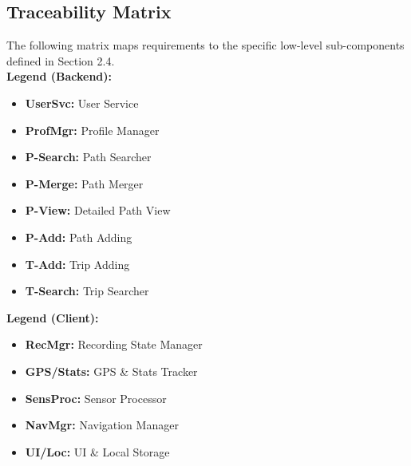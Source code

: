 \newpage

\subsection{Traceability Matrix}
The following matrix maps requirements to the specific low-level sub-components defined in Section 2.4.
\\
\textbf{Legend (Backend):}
\begin{itemize}
    \item \textbf{UserSvc:} User Service
    \item \textbf{ProfMgr:} Profile Manager
    \item \textbf{P-Search:} Path Searcher
    \item \textbf{P-Merge:} Path Merger
    \item \textbf{P-View:} Detailed Path View
    \item \textbf{P-Add:} Path Adding
    \item \textbf{T-Add:} Trip Adding
    \item \textbf{T-Search:} Trip Searcher
\end{itemize}
\textbf{Legend (Client):}
\begin{itemize}
    \item \textbf{RecMgr:} Recording State Manager
    \item \textbf{GPS/Stats:} GPS \& Stats Tracker
    \item \textbf{SensProc:} Sensor Processor
    \item \textbf{NavMgr:} Navigation Manager
    \item \textbf{UI/Loc:} UI \& Local Storage
\end{itemize}

